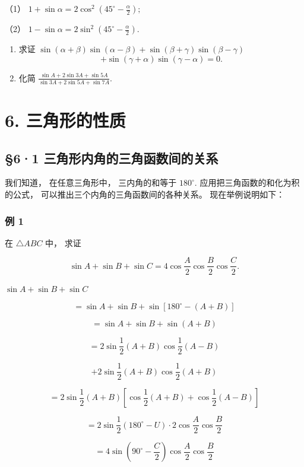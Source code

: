 （1）
\(1 + \sin \alpha = 2\cos^2\left(45^\circ -\frac{\alpha}{2}\right);\)

（2）
\(1 - \sin \alpha = 2\sin^2\left(45^\circ -\frac{\alpha}{2}\right).\)

\begin{enumerate}[start=6]
\item
  求证
  \(\sin (\alpha + \beta) \sin (\alpha - \beta) + \sin (\beta + \gamma) \sin (\beta - \gamma)\)
\[
+ \sin (\gamma + \alpha) \sin (\gamma - \alpha) = 0.
\]
\item
  化简
  \(\frac{\sin A + 2\sin 3A + \sin 5A}{\sin 3A + 2\sin 5A + \sin 7A}\).
\end{enumerate}

\chapter{6. 三角形的性质}

\section{§6·1 三角形内角的三角函数间的关系}

我们知道， 在任意三角形中， 三内角的和等于 \(180^{\circ}\).
应用把三角函数的和化为积的公式，
可以推出三个内角的三角函数间的各种关系。 现在举例说明如下：

\subsection{例 1}

在 \(\triangle ABC\) 中， 求证

\[
\sin A + \sin B + \sin C = 4 \cos \frac {A}{2} \cos \frac {B}{2} \cos \frac {C}{2}.
\]

 \(\sin A + \sin B + \sin C\)

\[
= \sin A + \sin B + \sin [ 180 ^{\circ} - (A + B) ]
\]

\[
= \sin A + \sin B + \sin (A + B)
\]

\[
= 2 \sin \frac {1}{2} (A + B) \cos \frac {1}{2} (A - B)
\]

\[
+ 2 \sin \frac {1}{2} (A + B) \cos \frac {1}{2} (A + B)
\]

\[
= 2 \sin \frac {1}{2} (A + B) \left[ \cos \frac {1}{2} (A + B) + \cos \frac {1}{2} (A - B) \right]
\]

\[
= 2 \sin \frac {1}{2} (180 ^{\circ} - U) \cdot 2 \cos \frac {A}{2} \cos \frac {B}{2}
\]

\[
= 4 \sin \left(90 ^{\circ} - \frac {C}{2}\right) \cos \frac {A}{2} \cos \frac {B}{2}
\]

